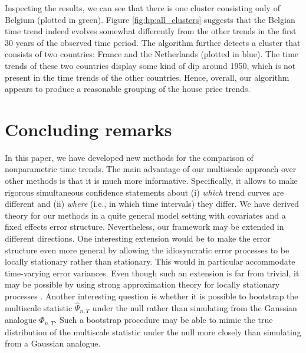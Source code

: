 \documentclass[12pt]{article}
\begin{document}
Inspecting the results, we can see that there is one cluster consisting only of Belgium (plotted in green). Figure \ref{fig:hp:all_clusters} suggests that the Belgian time trend indeed evolves somewhat differently from the other trends in the first $30$ years of the observed time period. %
The algorithm further detects a cluster that consists of two countries: France and the Netherlands (plotted in blue). The time trends of these two countries display some kind of dip around 1950, which is not present in the time trends of the other countries. 
Hence, overall, our algorithm appears to produce a reasonable grouping of the house price trends.



\section{Concluding remarks}


In this paper, we have developed new methods for the comparison of nonparametric time trends. The main advantage of our multiscale approach over other methods is that it is much more informative. Specifically, it allows to make rigorous simultaneous confidence statements about (i) \textit{which} trend curves are different and (ii) \textit{where} (i.e., in which time intervals) they differ. We have derived theory for our methods in a quite general model setting with covariates and a fixed effects error structure. Nevertheless, our framework may be extended in different directions. One interesting extension would be to make the error structure even more general by allowing the idiosyncratic error processes to be locally stationary rather than stationary. This would in particular accommodate time-varying error variances. Even though such an extension is far from trivial, it may be possible by using strong approximation theory for locally stationary processes \citep[][]{WuZhou2011}. Another interesting question is whether it is possible to bootstrap the multiscale statistic $\widehat{\Psi}_{n,T}$ under the null rather than simulating from the Gaussian analogue $\Phi_{n,T}$. Such a bootstrap procedure may be able to mimic the true distribution of the multiscale statistic under the null more closely than simulating from a Gaussian analogue.  




{\small
\setlength{\bibsep}{0.55em}
}
\end{document}
